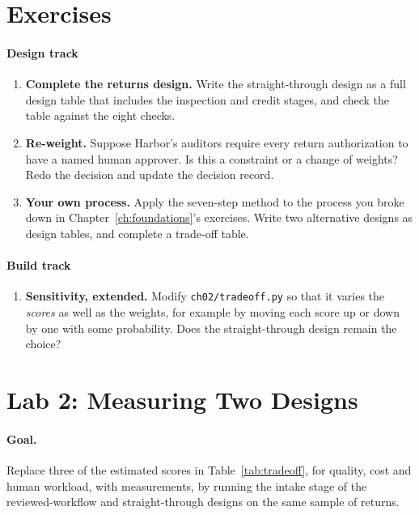 \section*{Exercises}

\paragraph{Design track}
\begin{enumerate}[itemsep=2pt]
  \item \textbf{Complete the returns design.} Write the straight-through design as a full design table that includes the inspection and credit stages, and check the table against the eight checks.
  \item \textbf{Re-weight.} Suppose Harbor's auditors require every return authorization to have a named human approver. Is this a constraint or a change of weights? Redo the decision and update the decision record.
  \item \textbf{Your own process.} Apply the seven-step method to the process you broke down in Chapter~\ref{ch:foundations}'s exercises. Write two alternative designs as design tables, and complete a trade-off table.
\end{enumerate}

\paragraph{Build track}
\begin{enumerate}[resume, itemsep=2pt]
  \item \textbf{Sensitivity, extended.} Modify \texttt{ch02/tradeoff.py} so that it varies the \emph{scores} as well as the weights, for example by moving each score up or down by one with some probability. Does the straight-through design remain the choice?
\end{enumerate}

\section*{Lab 2: Measuring Two Designs}

\paragraph{Goal.} Replace three of the estimated scores in Table~\ref{tab:tradeoff}, for quality, cost and human workload, with measurements, by running the intake stage of the reviewed-workflow and straight-through designs on the same sample of returns.

